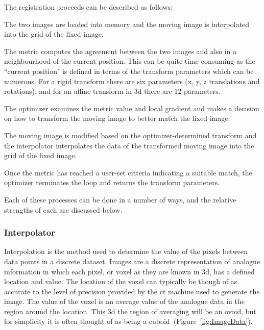 The registration proceeds can be described as follows:
\begin{inparaenum}[(i)]
\item The two images are loaded into memory and the moving image is interpolated into the grid of the fixed image.
\item The metric computes the agreement between the two images and also in a neighbourhood of the current position.
This can be quite time consuming as the ``current position" is defined in terms of the transform parameters which can be numerous.
For a rigid transform there are six parameters (x, y, z translations and rotations), and for an affine transform in \acs{3d} there are 12 parameters.
\item The optimizer examines the metric value and local gradient and makes a decision on how to transform the moving image to better match the fixed image.
\item The moving image is modified based on the optimizer-determined transform and the interpolator interpolates the data of the transformed moving image into the grid of the fixed image.
\item Once the metric has reached a user-set criteria indicating a suitable match, the optimizer terminates the loop and returns the transform parameters.
\end{inparaenum}
Each of these processes can be done in a number of ways, and the relative strengths of each are discussed below.

\subsubsection{Interpolator}
\label{sec:dvc_implement_register_interpolator}
Interpolation is the method used to determine the value of the pixels between data points in a discrete dataset.
Images are a discrete representation of analogue information in which each pixel, or voxel as they are known in \ac{3d}, has a defined location and value.
The location of the voxel can typically be though of as accurate to the level of precision provided by the \ac{ct} machine used to generate the image.
The value of the voxel is an average value of the analogue data in the region around the location.
This \ac{3d} the region of averaging will be an ovoid, but for simplicity it is often thought of as being a cuboid~(Figure~\ref{fig:ImageData}).


